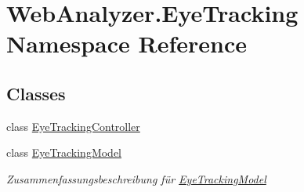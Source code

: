 \hypertarget{namespace_web_analyzer_1_1_eye_tracking}{}\section{Web\+Analyzer.\+Eye\+Tracking Namespace Reference}
\label{namespace_web_analyzer_1_1_eye_tracking}
\subsection*{Classes}
\begin{DoxyCompactItemize}
\item 
class \hyperlink{class_web_analyzer_1_1_eye_tracking_1_1_eye_tracking_controller}{Eye\+Tracking\+Controller}
\item 
class \hyperlink{class_web_analyzer_1_1_eye_tracking_1_1_eye_tracking_model}{Eye\+Tracking\+Model}
\begin{DoxyCompactList}\small\item\em Zusammenfassungsbeschreibung für \hyperlink{class_web_analyzer_1_1_eye_tracking_1_1_eye_tracking_model}{Eye\+Tracking\+Model} \end{DoxyCompactList}\end{DoxyCompactItemize}
